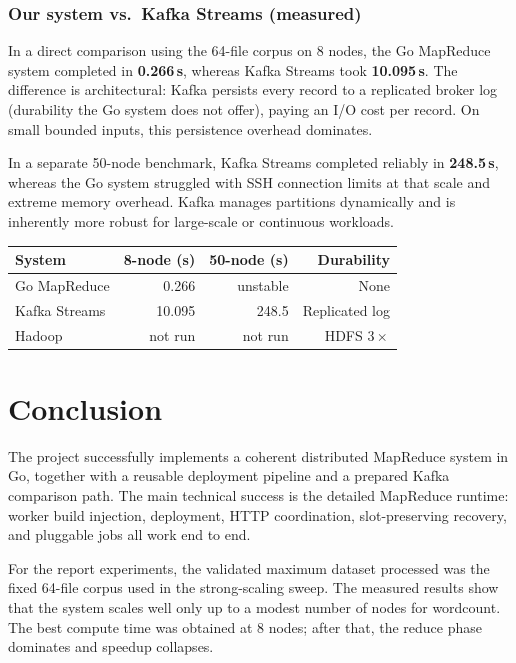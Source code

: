 \documentclass[11pt,a4paper]{article}
\begin{document}
\subsubsection{Our system vs.\ Kafka Streams (measured)}

In a direct comparison using the 64-file corpus on 8 nodes, the Go MapReduce
system completed in \textbf{0.266\,s}, whereas Kafka Streams took
\textbf{10.095\,s}. The difference is architectural: Kafka persists every
record to a replicated broker log (durability the Go system does not offer),
paying an I/O cost per record. On small bounded inputs, this persistence
overhead dominates.

In a separate 50-node benchmark, Kafka Streams completed reliably in
\textbf{248.5\,s}, whereas the Go system struggled with SSH connection limits
at that scale and extreme memory overhead. Kafka manages partitions dynamically and is inherently more
robust for large-scale or continuous workloads.

\begin{center}\small
\begin{tabular}{l r r r}
\toprule
\textbf{System} & \textbf{8-node (s)} & \textbf{50-node (s)} & \textbf{Durability} \\
\midrule
Go MapReduce & 0.266 & unstable & None \\
Kafka Streams & 10.095 & 248.5 & Replicated log \\
Hadoop & not run & not run & HDFS $3\times$ \\
\bottomrule
\end{tabular}
\end{center}



\section{Conclusion}

The project successfully implements a coherent distributed MapReduce system in
Go, together with a reusable deployment pipeline and a prepared Kafka
comparison path. The main technical success is the detailed MapReduce runtime:
worker build injection, deployment, HTTP coordination, slot-preserving recovery,
and pluggable jobs all work end to end.

For the report experiments, the validated maximum dataset processed was the
fixed 64-file corpus used in the strong-scaling sweep. The measured results show
that the system scales well only up to a modest number of nodes for wordcount.
The best compute time was obtained at 8 nodes; after that, the reduce phase
dominates and speedup collapses.
\end{document}
